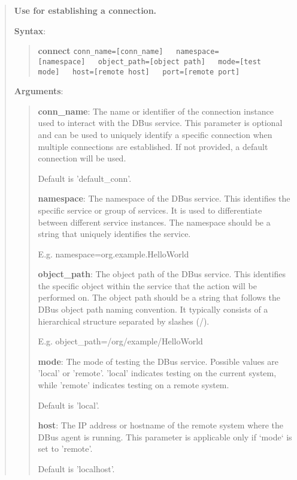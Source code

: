 \begin{quote}
\textbf{Use for establishing a connection.}

\textbf{Syntax}:

\begin{quote}
\textbf{connect}
\texttt{conn\_name={[}conn\_name{]}\ \ \ namespace={[}namespace{]}\ \ \ object\_path={[}object path{]}\ \ \ mode={[}test mode{]}\ \ \ host={[}remote host{]}\ \ \ port={[}remote port{]}}
\end{quote}

\textbf{Arguments}:

\begin{quote}
\textbf{conn\_name}: The name or identifier of the connection instance used to interact with the DBus service.
  This parameter is optional and can be used to uniquely identify a specific connection
  when multiple connections are established. If not provided, a default connection will be used.
  
  Default is 'default\_conn'.

\vspace{\baselineskip}

\textbf{namespace}: The namespace of the DBus service.
  This identifies the specific service or group of services.
  It is used to differentiate between different service instances.
  The namespace should be a string that uniquely identifies the service. 
  
  E.g. namespace=org.example.HelloWorld
  
\vspace{\baselineskip}

\textbf{object\_path}: The object path of the DBus service.
  This identifies the specific object within the service that the action will be performed on.
  The object path should be a string that follows the DBus object path naming convention.
  It typically consists of a hierarchical structure separated by slashes (/). 
  
  E.g. object\_path=/org/example/HelloWorld
  
\vspace{\baselineskip}

\textbf{mode}: The mode of testing the DBus service. Possible values are 'local' or 'remote'.
  'local' indicates testing on the current system, while 'remote' indicates testing on a remote system. 
  
  Default is 'local'.

\vspace{\baselineskip}
  
\textbf{host}: The IP address or hostname of the remote system where the DBus agent is running.
                 This parameter is applicable only if `mode` is set to 'remote'.
                 
				 Default is 'localhost'.
\end{quote}
\end{quote}

